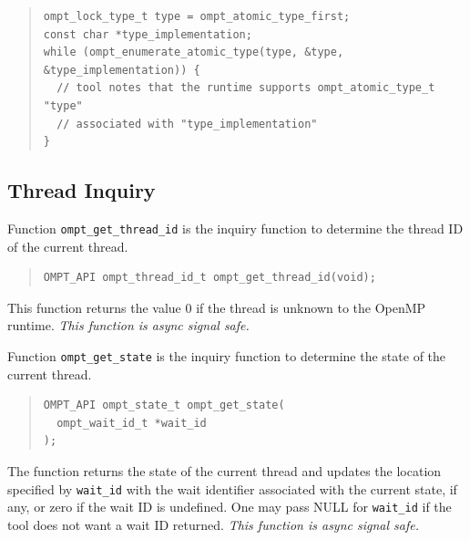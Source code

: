 \documentclass{article}
\begin{document}
\begin{quote}
\begin{verbatim}
ompt_lock_type_t type = ompt_atomic_type_first;
const char *type_implementation;
while (ompt_enumerate_atomic_type(type, &type, &type_implementation)) {
  // tool notes that the runtime supports ompt_atomic_type_t "type" 
  // associated with "type_implementation" 
}
\end{verbatim}
\end{quote}




\subsection{Thread Inquiry}
\label{sec:thread-inquiry}

Function \verb|ompt_get_thread_id| is the inquiry function to determine the thread ID of the 
current thread.

\begin{quote}
\begin{verbatim}
OMPT_API ompt_thread_id_t ompt_get_thread_id(void);
\end{verbatim}
\end{quote}
 
 \noindent
This function returns the value 0 if the thread is unknown to the OpenMP runtime.  {\em This function is async signal safe.}
 
Function \verb|ompt_get_state| is the inquiry function to determine the state of the 
current thread.

\begin{quote}
\begin{verbatim}
OMPT_API ompt_state_t ompt_get_state(
  ompt_wait_id_t *wait_id       
);
\end{verbatim}
\end{quote}
 
\noindent
The function returns the state of the current thread and updates
 the location specified by \verb|wait_id| with the wait
 identifier associated with the current state, if any, or zero if the wait ID is undefined.
One may pass NULL for \verb|wait_id| if the tool does not want a wait ID returned.
 {\em This function is async signal safe.}
 
\end{document}
